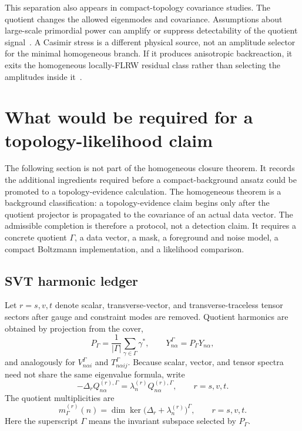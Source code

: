 \documentclass[
  aps,
  prd,
  reprint,
  superscriptaddress,
  floatfix,
  nofootinbib,
  longbibliography
]{revtex4-2}
\theoremstyle{plain}
\theoremstyle{definition}
\theoremstyle{remark}
\newcommand{\PG}{P_\Gamma}
\begin{document}
This separation also appears in compact-topology covariance studies.  The
quotient changes the allowed eigenmodes and covariance.  Assumptions about
large-scale primordial power can amplify or suppress detectability of the
quotient signal~\cite{COMPACTIIa,COMPACTIIb,COMPACTIIIb,COMPACTIIc}.  A
Casimir stress is a different physical source, not an amplitude selector for the
minimal homogeneous branch.  If it produces anisotropic backreaction, it exits
the homogeneous locally-FLRW residual class rather than selecting the amplitudes
inside it~\cite{NegroCasimir}.


\section{What would be required for a topology-likelihood claim}
\label{sec:transfer_protocol_v16}

The following section is not part of the homogeneous closure theorem.  It records
the additional ingredients required before a compact-background ansatz could be
promoted to a topology-evidence calculation.  The homogeneous theorem is a
background classification: a topology-evidence claim begins only after the
quotient projector is propagated to the covariance of an actual data vector.
The admissible completion is therefore a protocol, not a detection claim.  It
requires a concrete quotient $\Gamma$, a data vector, a mask, a foreground and
noise model, a compact Boltzmann implementation, and a likelihood comparison.

\subsection{SVT harmonic ledger}

Let $r=s,v,t$ denote scalar, transverse-vector, and transverse-traceless tensor
sectors after gauge and constraint modes are removed.  Quotient harmonics are
obtained by projection from the cover,
\begin{equation}
\PG=\frac{1}{|\Gamma|}\sum_{\gamma\in\Gamma}\gamma^*,
\qquad
Y^\Gamma_{n\alpha}=\PG Y_{n\alpha},
\end{equation}
and analogously for $V^\Gamma_{n\alpha i}$ and $T^\Gamma_{n\alpha ij}$.
Because scalar, vector, and tensor spectra need not share the same eigenvalue
formula, write
\begin{equation}
-\Delta_r Q^{(r),\Gamma}_{n\alpha}
=\lambda_n^{(r)} Q^{(r),\Gamma}_{n\alpha},
\qquad r=s,v,t .
\end{equation}
The quotient multiplicities are
\begin{equation}
m_\Gamma^{(r)}(n)
=
\dim\ker\bigl(\Delta_r+\lambda_n^{(r)}\bigr)^\Gamma,
\qquad r=s,v,t .
\label{eq:sector_multiplicity_v16}
\end{equation}
Here the superscript $\Gamma$ means the invariant subspace selected by $\PG$.
\end{document}
